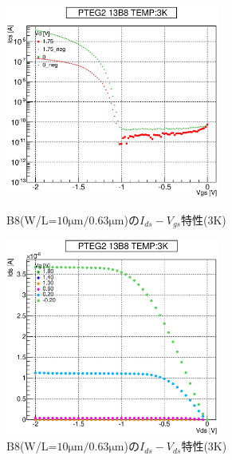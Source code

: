 				\begin{figure}[htbp]
					\begin{minipage}{0.5\hsize}
						\begin{center}
							\includegraphics[width=70mm]{./Chapter/Appendix/Picture/PBT/B8/PTEG2_13_B8_IdVg_3K.eps}
						\end{center}
						\caption{B8(W/L=$10\mathrm{\mu m}/0.63\mathrm{\mu m}$)の$I_{ds}-V_{gs}$特性(3K)}
						\label{fig:B8_IdVg_3K}
					\end{minipage}
					\begin{minipage}{0.5\hsize}
						\begin{center}
							\includegraphics[width=70mm]{./Chapter/Appendix/Picture/PBT/B8/PTEG2_13_B8_IdVd_3K.eps}
						\end{center}
						\caption{B8(W/L=$10\mathrm{\mu m}/0.63\mathrm{\mu m}$)の$I_{ds}-V_{ds}$特性(3K)}
						\label{fig:B8_IdVd_3K}
					\end{minipage}
				\end{figure}
				\clearpage

